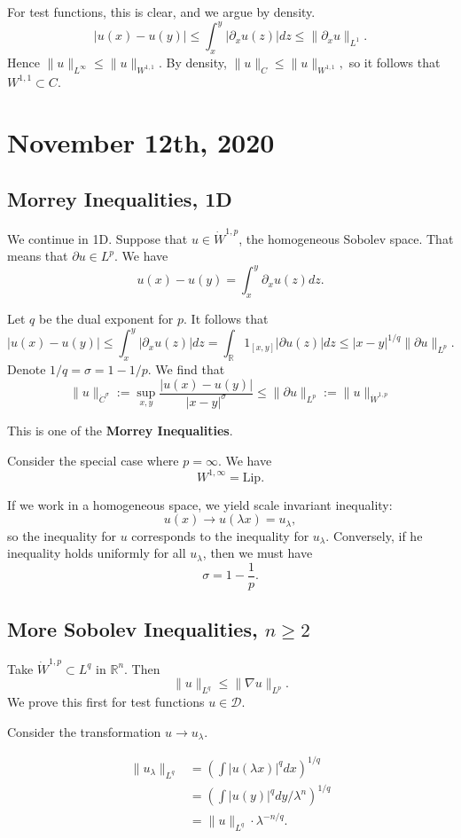 \documentclass[12pt]{scrartcl}
\newcommand{\R}{\mathbb{R}}
\begin{document}
For test functions, this is clear, and we argue by density.  
$$|u(x) - u(y)| \le \int_x^y |\partial_x u(z)|dz \le \|\partial_x u\|_{L^1}.$$
Hence $\|u\|_{L^{\infty}} \le \|u\|_{W^{1, 1}}.$
By density, $\|u\|_C \le \|u\|_{W^{1, 1}},$
so it follows that $W^{1, 1} \subset C$.
\pagebreak
\section{November 12th, 2020}
\subsection{Morrey Inequalities, 1D}
We continue in 1D.  Suppose that $u \in \dot{W}^{1, p}$, the homogeneous Sobolev space.  That means that $\partial u \in L^p$.  
We have 
$$u(x) - u(y) = \int_{x}^y \partial_x u(z)dz.$$

Let $q$ be the dual exponent for $p$.  It follows that 
$$|u(x) - u(y)| \le \int_x^y |\partial_x u(z)|dz = \int_\R 1_{[x, y]}|\partial u(z)|dz \le |x-y|^{1/q}\|\partial u\|_{L^p} .$$
Denote $1/q = \sigma = 1 - 1/p$.  We find that 
$$\|u\|_{\dot{C}^{\sigma}} := \sup_{x, y} \frac{|u(x) - u(y)|}{|x-y|^{\sigma}} \le \|\partial u\|_{L^p}:= \|u\|_{\dot{W}^{1, p}}$$

This is one of the \textbf{Morrey Inequalities}.  
\begin{proposition} Consider the special case where $p = \infty$.  We have 
$$W^{1, \infty} = \text{Lip}.$$
\end{proposition}

If we work in a homogeneous space, we yield scale invariant inequality:
$$u(x) \to u(\lambda x) = u_\lambda,$$
so the inequality for $u$ corresponds to the inequality for $u_\lambda$.  Conversely, if he inequality holds uniformly for all $u_\lambda$, then we must have 
$$\sigma = 1 - \frac{1}{p}.$$
\subsection{More Sobolev Inequalities, $n \ge 2$}
Take $\dot{W}^{1, p} \subset L^q$ in $\R^n$.  Then 
$$\|u\|_{L^q}\le \|\nabla u \|_{L^p}.$$
We prove this first for test functions $u \in \mathcal D$.

Consider the transformation $u \to u_\lambda$.   

\begin{align*}
\| u_\lambda \|_{L^q} &= \left (\int |u(\lambda x)|^q dx \right )^{1/q} \\
&= \left (\int |u(y)|^q dy/\lambda^n\right )^{1/q} \\
&= \|u\|_{L^{q}} \cdot \lambda^{-n/q}.
\end{align*}
\end{document}

